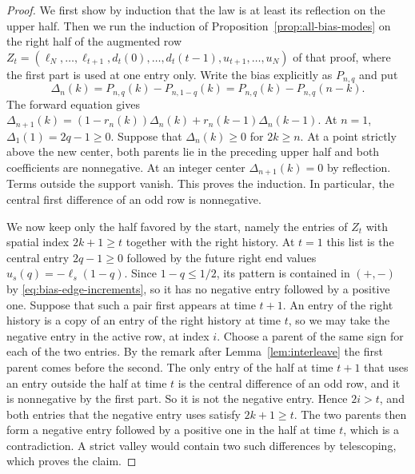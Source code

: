 \begin{proof}
We first show by induction that the law is
at least its reflection on the upper half. Then we run the induction
of Proposition~\ref{prop:all-bias-modes} on the right half of the
augmented row
$Z_t=(\ell_N,\ldots,\ell_{t+1},d_t(0),\ldots,d_t(t-1),u_{t+1},\ldots,u_N)$
of that proof, where the first part is used at one entry only.
Write the bias explicitly as $P_{n,q}$ and put
\[
 \Delta_n(k)=P_{n,q}(k)-P_{n,1-q}(k)
       =P_{n,q}(k)-P_{n,q}(n-k).
\]
The forward equation gives
$\Delta_{n+1}(k)=(1-r_n(k))\Delta_n(k)+r_n(k-1)\Delta_n(k-1)$.
At $n=1$, $\Delta_1(1)=2q-1\ge0$. Suppose that $\Delta_n(k)\ge0$
for $2k\ge n$. At a point strictly above the new center, both parents lie in
the preceding upper half and both coefficients are nonnegative.
At an integer center $\Delta_{n+1}(k)=0$ by reflection. Terms outside the
support vanish. This proves the induction. In particular, the
central first difference of an odd row is nonnegative.

We now keep only the half favored by the start, namely the entries
of $Z_t$ with spatial index $2k+1\ge t$ together with the right
history. At $t=1$ this list is the central entry $2q-1\ge0$ followed
by the future right end values $u_s(q)=-\ell_s(1-q)$. Since
$1-q\le1/2$, its pattern is contained in $(+,-)$ by
\eqref{eq:bias-edge-increments}, so it has no negative entry followed
by a positive one. Suppose that such a pair first appears at time
$t+1$. An entry of the right history is a copy of an entry of the
right history at time $t$, so we may take the negative entry in the
active row, at index $i$. Choose a parent of the same sign for each of
the two entries. By the remark after
Lemma~\ref{lem:interleave} the first parent comes before the second.
The only entry of the half at time $t+1$ that uses an entry outside the
half at time $t$ is the central difference of an odd row, and it is
nonnegative by the first part. So it is not the negative entry. Hence
$2i>t$, and both entries that the negative entry uses satisfy
$2k+1\ge t$.
The two parents then form a negative entry followed by a positive one
in the half at time $t$, which is a contradiction. A strict valley
would contain two such differences by telescoping, which proves the
claim.
\end{proof}
